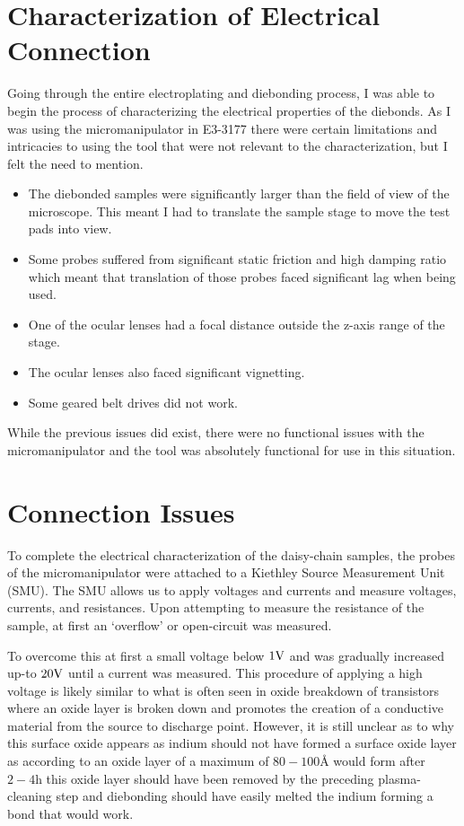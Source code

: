 \section{Characterization of Electrical Connection}

Going through the entire electroplating and diebonding process, I was able to begin the process of characterizing the electrical properties of the diebonds. As I was using the micromanipulator in E3-3177 there were certain limitations and intricacies to using the tool that were not relevant to the characterization, but I felt the need to mention.

\begin{itemize}
    \item The diebonded samples were significantly larger than the field of view of the microscope. This meant I had to translate the sample stage to move the test pads into view.
    \item Some probes suffered from significant static friction and high damping ratio which meant that translation of those probes faced significant lag when being used.
    \item One of the ocular lenses had a focal distance outside the z-axis range of the stage.
    \item The ocular lenses also faced significant vignetting.
    \item Some geared belt drives did not work.
\end{itemize}

While the previous issues did exist, there were no functional issues with the micromanipulator and the tool was absolutely functional for use in this situation.

\section{Connection Issues}
To complete the electrical characterization of the daisy-chain samples, the probes of the micromanipulator were attached to a Kiethley Source Measurement Unit (SMU). The SMU allows us to apply voltages and currents and measure voltages, currents, and resistances. Upon attempting to measure the resistance of the sample, at first an `overflow' or open-circuit was measured.

To overcome this at first a small voltage below $1 \V$ and was gradually increased up-to $20 \V$ until a current was measured. This procedure of applying a high voltage is likely similar to what is often seen in oxide breakdown of transistors \cite{oxide_breakdown} where an oxide layer is broken down and promotes the creation of a conductive material from the source to discharge point. However, it is still unclear as to why this surface oxide appears as indium should not have formed a surface oxide layer as according to \cite{indiumCorpSurfacePrep} an oxide layer of a maximum of $80-100 \unit{\angstrom}$ would form after $2-4\unit{\hour}$ this oxide layer should have been removed by the preceding plasma-cleaning step \cite{plasma_clean_oxide} and diebonding should have easily melted the indium forming a bond that would work.

